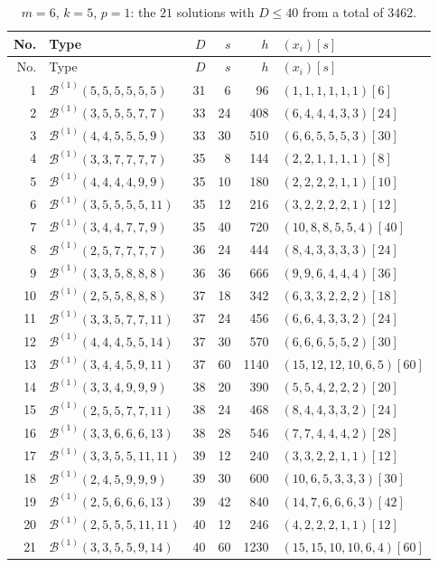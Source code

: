\documentclass[11pt,a4paper]{article}
\newcommand{\Ber}{\mathcal B}
\theoremstyle{definition}
\theoremstyle{plain}
\begin{document}
\begin{longtable}{@{}r l r r r l@{}}
\caption{$m=6$, $k=5$, $p=1$: the $21$ solutions with $D\leq40$ from a total of $3462$.}\label{tab:m6p1}\\
\toprule
No. & Type & $D$ & $s$ & $h$ & $(x_i)[s]$\\
\midrule
\endfirsthead
\toprule
No. & Type & $D$ & $s$ & $h$ & $(x_i)[s]$\\
\midrule
\endhead
1 & $\Ber^{(1)}(5,5,5,5,5,5)$ & 31 & 6 & 96 & $(1,1,1,1,1,1)[6]$ \\
2 & $\Ber^{(1)}(3,5,5,5,7,7)$ & 33 & 24 & 408 & $(6,4,4,4,3,3)[24]$ \\
3 & $\Ber^{(1)}(4,4,5,5,5,9)$ & 33 & 30 & 510 & $(6,6,5,5,5,3)[30]$ \\
4 & $\Ber^{(1)}(3,3,7,7,7,7)$ & 35 & 8 & 144 & $(2,2,1,1,1,1)[8]$ \\
5 & $\Ber^{(1)}(4,4,4,4,9,9)$ & 35 & 10 & 180 & $(2,2,2,2,1,1)[10]$ \\
6 & $\Ber^{(1)}(3,5,5,5,5,11)$ & 35 & 12 & 216 & $(3,2,2,2,2,1)[12]$ \\
7 & $\Ber^{(1)}(3,4,4,7,7,9)$ & 35 & 40 & 720 & $(10,8,8,5,5,4)[40]$ \\
8 & $\Ber^{(1)}(2,5,7,7,7,7)$ & 36 & 24 & 444 & $(8,4,3,3,3,3)[24]$ \\
9 & $\Ber^{(1)}(3,3,5,8,8,8)$ & 36 & 36 & 666 & $(9,9,6,4,4,4)[36]$ \\
10 & $\Ber^{(1)}(2,5,5,8,8,8)$ & 37 & 18 & 342 & $(6,3,3,2,2,2)[18]$ \\
11 & $\Ber^{(1)}(3,3,5,7,7,11)$ & 37 & 24 & 456 & $(6,6,4,3,3,2)[24]$ \\
12 & $\Ber^{(1)}(4,4,4,5,5,14)$ & 37 & 30 & 570 & $(6,6,6,5,5,2)[30]$ \\
13 & $\Ber^{(1)}(3,4,4,5,9,11)$ & 37 & 60 & 1140 & $(15,12,12,10,6,5)[60]$ \\
14 & $\Ber^{(1)}(3,3,4,9,9,9)$ & 38 & 20 & 390 & $(5,5,4,2,2,2)[20]$ \\
15 & $\Ber^{(1)}(2,5,5,7,7,11)$ & 38 & 24 & 468 & $(8,4,4,3,3,2)[24]$ \\
16 & $\Ber^{(1)}(3,3,6,6,6,13)$ & 38 & 28 & 546 & $(7,7,4,4,4,2)[28]$ \\
17 & $\Ber^{(1)}(3,3,5,5,11,11)$ & 39 & 12 & 240 & $(3,3,2,2,1,1)[12]$ \\
18 & $\Ber^{(1)}(2,4,5,9,9,9)$ & 39 & 30 & 600 & $(10,6,5,3,3,3)[30]$ \\
19 & $\Ber^{(1)}(2,5,6,6,6,13)$ & 39 & 42 & 840 & $(14,7,6,6,6,3)[42]$ \\
20 & $\Ber^{(1)}(2,5,5,5,11,11)$ & 40 & 12 & 246 & $(4,2,2,2,1,1)[12]$ \\
21 & $\Ber^{(1)}(3,3,5,5,9,14)$ & 40 & 60 & 1230 & $(15,15,10,10,6,4)[60]$ \\
\bottomrule
\end{longtable}
\end{document}
